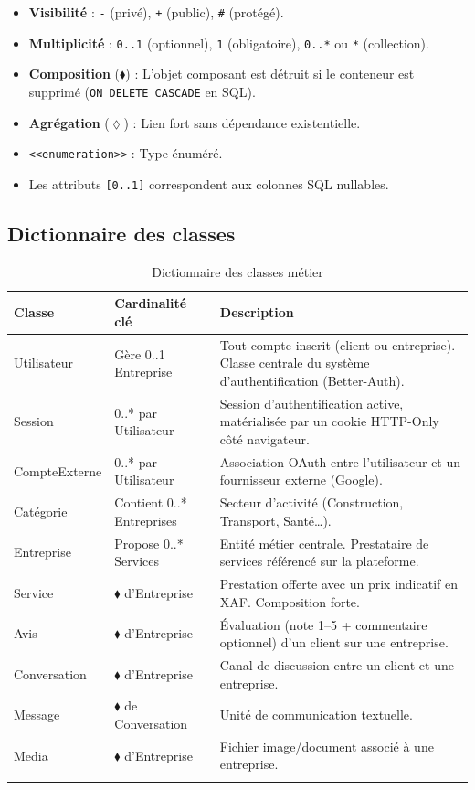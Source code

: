 \documentclass[12pt,a4paper]{article}
\begin{document}
\begin{itemize}
    \item \textbf{Visibilité} : \texttt{-} (privé), \texttt{+} (public), \texttt{\#} (protégé).
    \item \textbf{Multiplicité} : \texttt{0..1} (optionnel), \texttt{1} (obligatoire), \texttt{0..*} ou \texttt{*} (collection).
    \item \textbf{Composition} ($\blacklozenge$) : L'objet composant est détruit si le conteneur est supprimé (\texttt{ON DELETE CASCADE} en SQL).
    \item \textbf{Agrégation} ($\lozenge$) : Lien fort sans dépendance existentielle.
    \item \texttt{<<enumeration>>} : Type énuméré.
    \item Les attributs \texttt{[0..1]} correspondent aux colonnes SQL nullables.
\end{itemize}

\subsection{Dictionnaire des classes}

\begin{longtable}{p{3cm}p{4cm}p{6.5cm}}
\toprule
\textbf{Classe} & \textbf{Cardinalité clé} & \textbf{Description} \\
\midrule
\endhead
Utilisateur & Gère 0..1 Entreprise & Tout compte inscrit (client ou entreprise). Classe centrale du système d'authentification (Better-Auth). \\
Session & 0..* par Utilisateur & Session d'authentification active, matérialisée par un cookie HTTP-Only côté navigateur. \\
CompteExterne & 0..* par Utilisateur & Association OAuth entre l'utilisateur et un fournisseur externe (Google). \\
Catégorie & Contient 0..* Entreprises & Secteur d'activité (Construction, Transport, Santé\ldots). \\
Entreprise & Propose 0..* Services & Entité métier centrale. Prestataire de services référencé sur la plateforme. \\
Service & $\blacklozenge$ d'Entreprise & Prestation offerte avec un prix indicatif en XAF. Composition forte. \\
Avis & $\blacklozenge$ d'Entreprise & Évaluation (note 1--5 + commentaire optionnel) d'un client sur une entreprise. \\
Conversation & $\blacklozenge$ d'Entreprise & Canal de discussion entre un client et une entreprise. \\
Message & $\blacklozenge$ de Conversation & Unité de communication textuelle. \\
Media & $\blacklozenge$ d'Entreprise & Fichier image/document associé à une entreprise. \\
\bottomrule
\caption{Dictionnaire des classes métier}
\end{longtable}
\end{document}
